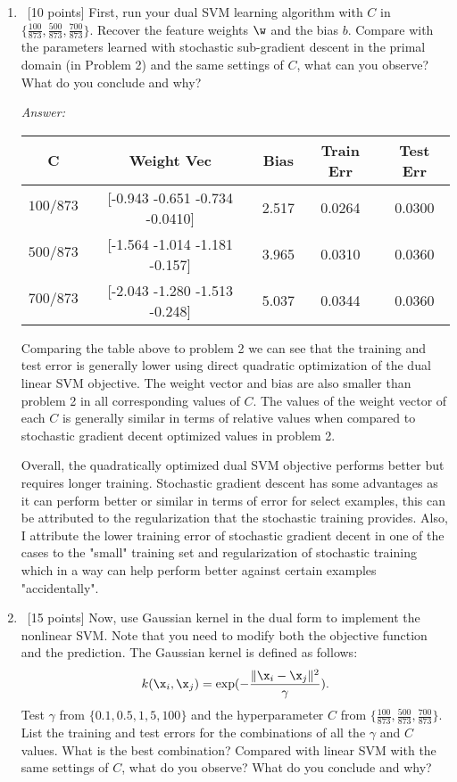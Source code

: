 \documentclass[12pt, fullpage,letterpaper]{article}
\begin{document}
\begin{enumerate}
\begin{enumerate}
	\item ~[10 points] First, run your dual SVM learning algorithm with   $C$ in $\{\frac{100}{873}, \frac{500}{873}, \frac{700}{873}\}$. Recover the feature weights $\w$ and the bias $b$. Compare with the parameters learned with stochastic sub-gradient descent in the primal domain (in Problem 2) and the same settings of $C$, what can you observe? What do you conclude and why?

	\textit{Answer:}

	\begin{center}
	\begin{tabular}{|c|c|c|c|c|}
		\hline
		C & Weight Vec & Bias & Train Err & Test Err\\
		\hline
		$100/873$ & [-0.943 -0.651 -0.734 -0.0410] & 2.517 & 0.0264 & 0.0300 \\
		\hline
		$500/873$ & [-1.564  -1.014 -1.181 -0.157] & 3.965 & 0.0310 & 0.0360 \\
		\hline
		$700/873$ & [-2.043 -1.280 -1.513 -0.248] & 5.037 & 0.0344 & 0.0360 \\
		\hline
	\end{tabular}
	\end{center}

	Comparing the table above to problem 2 we can see that the training and test error is generally lower using direct quadratic optimization of the dual linear SVM objective. 
	The weight vector and bias are also smaller than problem 2 in all corresponding values of $C$.
	The values of the weight vector of each $C$ is generally similar in terms of relative values when compared to stochastic gradient decent optimized values in problem 2.

	Overall, the quadratically optimized dual SVM objective performs better but requires longer training. 
	Stochastic gradient descent has some advantages as it can perform better or similar in terms of error for select examples, this can be attributed to the regularization that the stochastic training provides.
	Also, I attribute the lower training error of stochastic gradient decent in one of the cases to the "small" training set and regularization of stochastic training which in a way can help perform better against certain examples "accidentally".

	
	\item~[15 points] Now, use Gaussian kernel in the dual form to implement the nonlinear SVM. Note that you need to modify both the objective function and the prediction. The Gaussian kernel is defined as follows:
	\[
	k(\x_i, \x_j) = \exp(-\frac{\|\x_i - \x_j\|^2}{\gamma}).
	\]
	Test $\gamma$ from $\{0.1, 0.5, 1,  5, 100\}$ and the hyperparameter $C$ from $\{ \frac{100}{873}, \frac{500}{873},  \frac{700}{873}\}$. List the training and test errors for the combinations of all the $\gamma$ and $C$ values. What is the best combination? Compared with linear SVM with the same settings of $C$, what do you observe? What do you conclude and why?  


\end{enumerate}
\end{enumerate}
\end{document}
